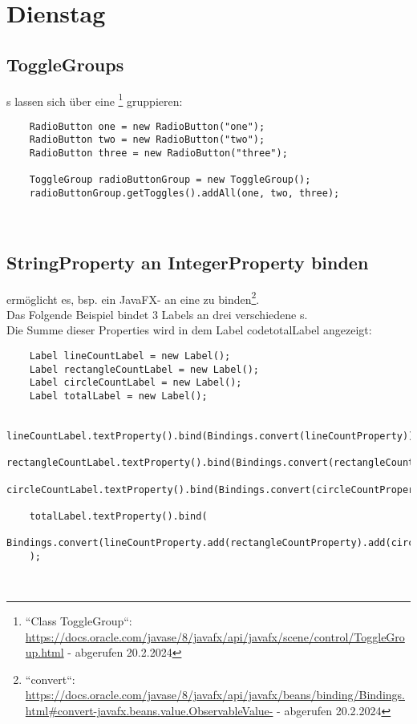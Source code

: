 \section{Dienstag}

\subsection*{ToggleGroups}
s lassen sich über eine \footnote{
``Class ToggleGroup``: \url{https://docs.oracle.com/javase/8/javafx/api/javafx/scene/control/ToggleGroup.html} - abgerufen 20.2.2024
} gruppieren:

\begin{verbatim}
    RadioButton one = new RadioButton("one");
    RadioButton two = new RadioButton("two");
    RadioButton three = new RadioButton("three");

    ToggleGroup radioButtonGroup = new ToggleGroup();
    radioButtonGroup.getToggles().addAll(one, two, three);
\end{verbatim}\\

\subsection*{StringProperty an IntegerProperty binden}

\begin{center}\end{center}
ermöglicht es, bsp. ein JavaFX- an eine  zu binden\footnote{
``convert``: \url{https://docs.oracle.com/javase/8/javafx/api/javafx/beans/binding/Bindings.html#convert-javafx.beans.value.ObservableValue-} - abgerufen 20.2.2024
}.\\

\noindent
Das Folgende Beispiel bindet 3 Labels an drei verschiedene s.\\
Die Summe dieser Properties wird in dem Label code{totalLabel} angezeigt:
\begin{verbatim}
    Label lineCountLabel = new Label();
    Label rectangleCountLabel = new Label();
    Label circleCountLabel = new Label();
    Label totalLabel = new Label();

    lineCountLabel.textProperty().bind(Bindings.convert(lineCountProperty));
    rectangleCountLabel.textProperty().bind(Bindings.convert(rectangleCountProperty));
    circleCountLabel.textProperty().bind(Bindings.convert(circleCountProperty));

    totalLabel.textProperty().bind(
        Bindings.convert(lineCountProperty.add(rectangleCountProperty).add(circleCountProperty))
    );
\end{verbatim}\\

